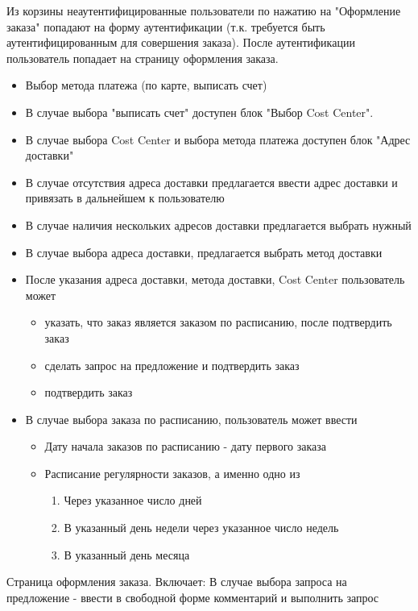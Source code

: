 {\begin{itogolong}
 Из корзины неаутентифицированные пользователи по нажатию на "Оформление заказа" попадают на форму аутентификации (т.к. требуется быть аутентифицированным для совершения заказа). После аутентификации пользователь попадает на страницу оформления заказа.
\begin{itemize}
\item Выбор метода платежа (по карте, выписать счет)
\item В случае выбора "выписать счет" доступен блок "Выбор Cost Center".
\item В случае выбора Cost Center и выбора метода платежа доступен блок "Адрес доставки"
\item В случае отсутствия адреса доставки предлагается ввести адрес доставки и привязать в дальнейшем к пользователю
\item В случае наличия нескольких адресов доставки предлагается выбрать нужный
\item В случае выбора адреса доставки, предлагается выбрать метод доставки
\item После указания адреса доставки, метода доставки, Cost Center пользователь может
\begin{itemize}
\item указать, что заказ является заказом по расписанию, после подтвердить заказ
\item сделать запрос на предложение и подтвердить заказ
\item подтвердить заказ
\end{itemize}
\item В случае выбора заказа по расписанию, пользователь может ввести
\begin{itemize}
\item Дату начала заказов по расписанию - дату первого заказа
\item Расписание регулярности заказов, а именно одно из
\begin{enumerate}
\item Через указанное число дней
\item В указанный день недели через указанное число недель
\item В указанный день месяца
\end{enumerate}
\end{itemize}
\end{itemize}
Страница оформления заказа. Включает:
В случае выбора запроса на предложение - ввести в свободной форме комментарий и выполнить запрос
\end{itogolong}



}
\ifcand
